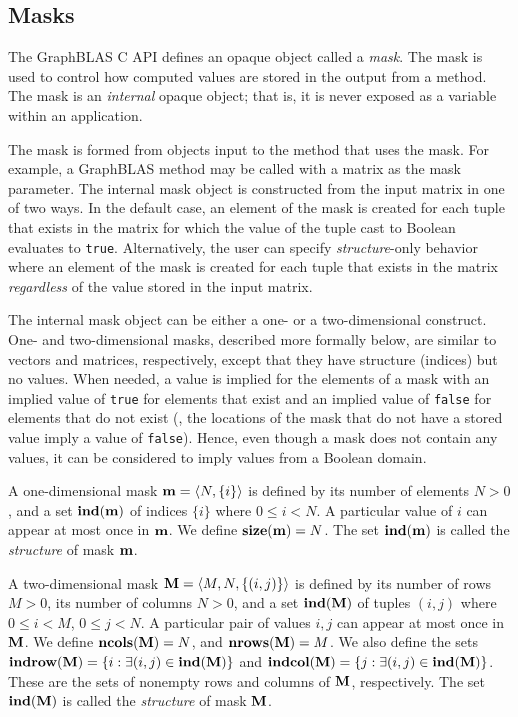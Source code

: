\subsection{Masks}
\label{Sec:Masks}

The GraphBLAS C API defines an opaque object called a \emph{mask}.  The mask
is used to control how computed values are stored in the output from a method. 
The mask is an \emph{internal} opaque object; that is, it is never exposed as a 
variable within an application. 

The mask is formed from objects input to the method that uses 
the mask.  For example, a GraphBLAS method may be called with a matrix as the mask
parameter.   The internal mask object is constructed from the input matrix in one
of two ways.  In the default case, an element of the mask is created for each 
tuple that exists in the matrix for which the value of the tuple cast to Boolean 
evaluates to {\tt true}.  Alternatively, the user can specify {\em structure}-only 
behavior where an element of the mask is created for each tuple that exists in 
the matrix {\em regardless} of the value stored in the input matrix.

The internal mask object can be either a one- or a two-dimensional construct.  
One- and two-dimensional masks, described more formally below, are similar to
vectors and matrices, respectively, except that they have structure
(indices) but no values.  When needed, a value is implied for the elements of a 
mask with an implied value of {\tt true} for elements that exist 
and an implied value of {\tt false} for elements that do not exist (\ie,
the locations of the mask that do not have a stored value imply a value of {\tt false}).
Hence, even though a mask does not contain any values, it can be 
considered to imply values from a Boolean domain.

A one-dimensional mask ${\bf m} = \langle N, \{ i \} \rangle$ is
defined by its number of elements $N>0$, and a set $\mathbf{ind}({\bf m})$
of indices $\{ i \}$ where $0 \leq i < N$.  A particular value of $i$ can
appear at most once in ${\bf m}$. We define $\mathbf{size}({\bf m})
= N$. The set $\mathbf{ind}({\bf m})$ is called the \emph{structure} of mask ${\bf m}$.

A two-dimensional mask ${\bf M} = \langle M, N, \{ (i,j) \}
\rangle$ is defined by its number of rows $M>0$, its number of
columns $N>0$, and a set $\mathbf{ind}({\bf M})$ of tuples $(i,j)$
where $0 \leq i < M$, $0 \leq j < N$.   A particular pair of values
$i,j$ can appear at most once in ${\bf M}$.  We define
$\mathbf{ncols}({\bf M}) = N$, and $\mathbf{nrows}({\bf M}) = M$.
We also define the sets ${\bf indrow({\bf M})} = \{ i : \exists
(i,j) \in \mathbf{ind}({\bf M}) \}$ and ${\bf indcol({\bf M})}
= \{ j : \exists (i,j) \in \mathbf{ind}({\bf M}) \}$.  These are
the sets of nonempty rows and columns of ${\bf M}$, respectively.
The set $\mathbf{ind}({\bf M})$ is called the \emph{structure} of 
mask ${\bf M}$.

